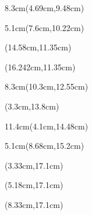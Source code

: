 \documentclass[a4paper]{article}
\begin{document}
\begin{Form}
\begin{textblock*}{8.3cm}(4.69cm,9.48cm) %
\noindent
\AbschlussArt
\end{textblock*}

\begin{textblock*}{5.1cm}(7.6cm,10.22cm) %
\noindent
\AbschlussOrt
\end{textblock*}

\begin{textblock*}{0.3cm}(14.58cm,11.35cm) %
\end{textblock*}

\begin{textblock*}{0.3cm}(16.242cm,11.35cm) %
\end{textblock*}

\begin{textblock*}{8.3cm}(10.3cm,12.55cm) %
\noindent
\NachweisAbschluss
\end{textblock*}

\begin{textblock*}{0.3cm}(3.3cm,13.8cm) %
\end{textblock*}

\begin{textblock*}{11.4cm}(4.1cm,14.48cm) %
\noindent
\Berufsausbildung
\end{textblock*}

\begin{textblock*}{5.1cm}(8.68cm,15.2cm) %
\noindent
\BerufsausbildungOrt
\end{textblock*}

\begin{textblock*}{0.38cm}(3.33cm,17.1cm) %
\end{textblock*}

\begin{textblock*}{0.38cm}(5.18cm,17.1cm) %
\end{textblock*}

\begin{textblock*}{0.38cm}(8.33cm,17.1cm) %
\end{textblock*}


\end{Form}
\end{document}
